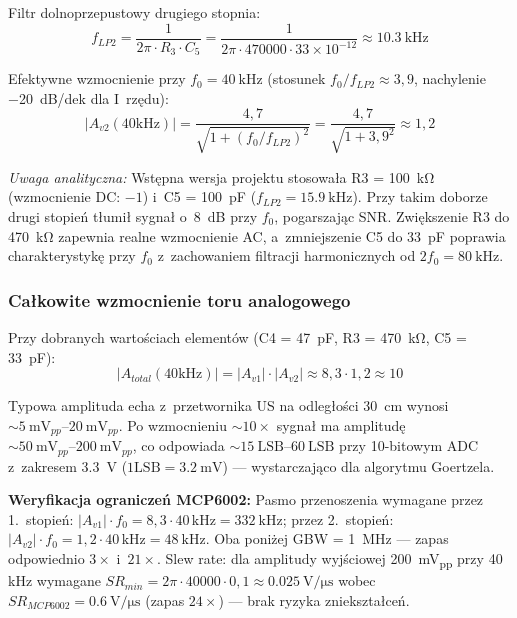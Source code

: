 \documentclass[a4paper,11pt]{article}
\begin{document}
	Filtr dolnoprzepustowy drugiego stopnia:
	\begin{equation}
		f_{LP2} = \frac{1}{2\pi \cdot R_3 \cdot C_5} = \frac{1}{2\pi \cdot 470000 \cdot 33 \times 10^{-12}} \approx \SI{10,3}{\kilo\hertz}
		\label{eq:flp2}
	\end{equation}
	
	Efektywne wzmocnienie przy $f_0 = \SI{40}{\kilo\hertz}$ (stosunek $f_0/f_{LP2} \approx 3{,}9$,
	nachylenie \SI{-20}{\deci\bel}/dek dla I~rzędu):
	\begin{equation}
		|A_{v2}(40\text{kHz})| = \frac{4{,}7}{\sqrt{1 + (f_0/f_{LP2})^2}} = \frac{4{,}7}{\sqrt{1 + 3{,}9^2}} \approx 1{,}2
		\label{eq:gain2_f0}
	\end{equation}
	
	\textit{Uwaga analityczna:} Wstępna wersja projektu stosowała R3 = \SI{100}{\kilo\ohm}
	(wzmocnienie DC: $-1$) i~C5 = \SI{100}{\pico\farad} ($f_{LP2} = \SI{15,9}{\kilo\hertz}$).
	Przy takim doborze drugi stopień tłumił sygnał o~\SI{8}{\deci\bel} przy $f_0$,
	pogarszając SNR. Zwiększenie R3 do \SI{470}{\kilo\ohm} zapewnia realne
	wzmocnienie AC, a~zmniejszenie C5 do \SI{33}{\pico\farad} poprawia
	charakterystykę przy $f_0$ z~zachowaniem filtracji harmonicznych
	od $2f_0 = \SI{80}{\kilo\hertz}$.
	
	\subsubsection{Całkowite wzmocnienie toru analogowego}
	
	Przy dobranych wartościach elementów (C4 = \SI{47}{\pico\farad}, R3 = \SI{470}{\kilo\ohm},
	C5 = \SI{33}{\pico\farad}):
	\begin{equation}
		|A_{total}(40\text{kHz})| = |A_{v1}| \cdot |A_{v2}| \approx 8{,}3 \cdot 1{,}2 \approx 10
		\label{eq:gain_total_current}
	\end{equation}
	
	Typowa amplituda echa z~przetwornika US na odległości \SI{30}{\centi\metre}
	wynosi ${\sim}\SIrange{5}{20}{\milli\volt_{pp}}$. Po wzmocnieniu ${\sim}10\times$
	sygnał ma amplitudę ${\sim}\SIrange{50}{200}{\milli\volt_{pp}}$, co odpowiada
	${\sim}\SIrange{15}{60}{\text{LSB}}$ przy 10-bitowym ADC z~zakresem \SI{3,3}{\volt}
	($1\text{LSB} = \SI{3,2}{\milli\volt}$) --- wystarczająco dla algorytmu
	Goertzela.
	
	\textbf{Weryfikacja ograniczeń MCP6002:} Pasmo przenoszenia wymagane
	przez 1.~stopień: $|A_{v1}| \cdot f_0 = 8{,}3 \cdot 40\,\text{kHz} = \SI{332}{\kilo\hertz}$;
	przez 2.~stopień: $|A_{v2}| \cdot f_0 = 1{,}2 \cdot 40\,\text{kHz} = \SI{48}{\kilo\hertz}$.
	Oba poniżej GBW = \SI{1}{\mega\hertz} --- zapas odpowiednio $3\times$ i~$21\times$.
	Slew rate: dla amplitudy wyjściowej \SI{200}{\milli\volt_{pp}} przy 40\,kHz wymagane
	$SR_{min} = 2\pi \cdot 40000 \cdot 0{,}1 \approx \SI{0,025}{\volt\per\micro\second}$
	wobec $SR_{MCP6002} = \SI{0,6}{\volt\per\micro\second}$ (zapas $24\times$) ---
	brak ryzyka zniekształceń.
	
\end{document}
